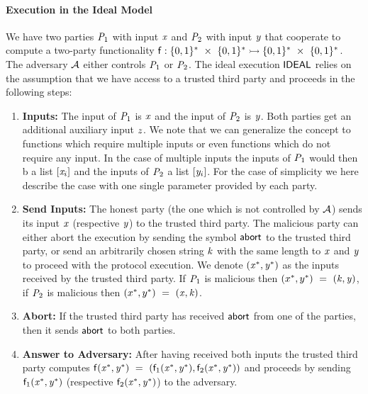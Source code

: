 \paragraph{Execution in the Ideal Model} We have two parties $\mathit{P}_{1}$ with input $\mathit{x}$ and $\mathit{P}_{2}$ with input $\mathit{y}$ that cooperate to compute a two-party functionality $\mathsf{f} : \{0,1\}^{*} ~\times~ \{0,1\}^{*} \rightarrowtail \{0,1\}^{*} ~\times~ \{0,1\}^{*}$.
The adversary $\mathcal{A}$ either controls $\mathit{P}_{1}$ or $\mathit{P}_{2}$.
The ideal execution $\mathsf{IDEAL}$ relies on the assumption that we have access to a trusted third party and proceeds in the following steps:

\begin{enumerate}
    \item \textbf{Inputs:} The input of $\mathit{P}_{1}$ is $\mathit{x}$ and the input of $\mathit{P}_{2}$ is $\mathit{y}$.
    Both parties get an additional auxiliary input $\mathit{z}$.
    We note that we can generalize the concept to functions which require multiple inputs or even functions which do not require any input.
    In the case of multiple inputs the inputs of $\mathit{P}_{1}$ would then b a list $[\mathit{x}_i]$ and the inputs of $\mathit{P}_{2}$ a list $[\mathit{y}_i]$.
    For the case of simplicity we here describe the case with one single parameter provided by each party.
    \item \textbf{Send Inputs:} The honest party (the one which is not controlled by $\mathcal{A}$) sends its input $\mathit{x}$ (respective $\mathit{y}$) to the trusted third party.
    The malicious party can either abort the execution by sending the symbol $\mathsf{abort}$ to the trusted third party, or send an arbitrarily chosen string $\mathit{k}$ with the same length to $\mathit{x}$ and $\mathit{y}$ to proceed with the protocol execution.
    We denote $(\mathit{x}^*, \mathit{y}^*)$ as the inputs received by the trusted third party.
    If $\mathit{P}_{1}$ is malicious then $(x^*, y^*) ~=~ (\mathit{k}, \mathit{y})$, if $\mathit{P}_{2}$ is malicious then $(x^*, y^*) ~=~ (\mathit{x}, \mathit{k})$.
    \item \textbf{Abort:} If the trusted third party has received $\mathsf{abort}$ from one of the parties, then it sends $\mathsf{abort}$ to both parties.
    \item \textbf{Answer to Adversary:} After having received both inputs the trusted third party computes $\mathsf{f}(\mathit{x}^*, \mathit{y}^*) ~=~ (\mathsf{f}_1(\mathit{x}^*, \mathit{y}^*), \mathsf{f}_2(\mathit{x}^*, \mathit{y}^*))$ and proceeds by sending $\mathsf{f}_1(\mathit{x}^*, \mathit{y}^*)$ (respective $\mathsf{f}_2(\mathit{x}^*, \mathit{y}^*)$) to the adversary.

\end{enumerate}
